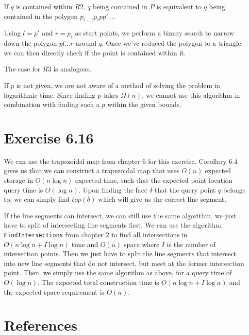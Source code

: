 \documentclass[11pt,a4paper]{article}
\begin{document}
If $q$ is contained within $R2$, $q$ being contained in $P$ is equivalent to
$q$ being contained in the polygon $p_{i-1} p_i p p' \ldots$.

Using $l = p'$ and $r = p_i$ as start points, we perform a binary search to
narrow down the polygon $p l \ldots r$ around $q$. Once we've reduced the
polygon to a triangle, we can then directly check if the point is contained
within it.

The case for $R3$ is analogous.

If $p$ is not given, we are not aware of a method of solving the problem in
logarithmic time. Since finding $p$ takes $\Omega(n)$\cite{lee79}, we cannot
use this algorithm in combination with finding such a $p$ within the given
bounds.

\section{Exercise 6.16}

We can use the trapezoidal map from chapter 6 for this
exercise. Corollary 6.4 gives us that we can construct a trapezoidal
map that uses $O(n)$ expected storage in $O(n \log n)$ expected time,
such that the expected point location query time is $O(\log n)$. Upon
finding the face $\delta$ that the query point $q$ belongs to, we can
simply find $top(\delta)$ which will give us the correct line segment.

If the line segments can intersect, we can still use the same
algorithm, we just have to split of intersecting line segments
first. We can use the algorithm \verb+FindIntersections+ from chapter
2 to find all intersections in $O(n \log n + I \log n)$ time and
$O(n)$ space where $I$ is the number of intersection points. Then we
just have to split the line segments that intersect into new line
segments that do not intersect, but meet at the former intersection
point. Then, we simply use the same algorithm as above, for a query
time of $O(\log n)$. The expected total construction time is $O(n \log
n + I \log n)$ and the expected space requirement is $O(n)$.

\section{References}

\end{document}
